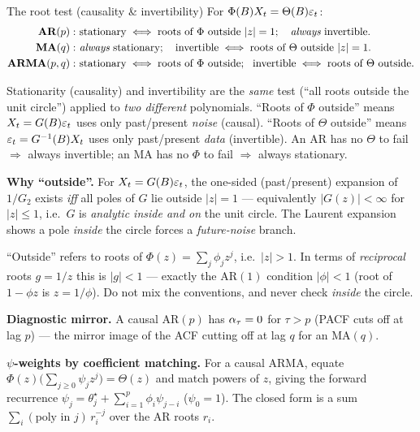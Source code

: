 \documentclass[11pt]{article}
\begin{document}
\begin{result}{The root test (causality \& invertibility)}
For $\Phi(B)X_t=\Theta(B)\varepsilon_t$:
\[
\begin{aligned}
\textbf{AR}(p):&\ \text{stationary}\iff\text{roots of }\Phi\text{ outside }|z|=1;\quad \emph{always}\text{ invertible.}\\
\textbf{MA}(q):&\ \emph{always}\text{ stationary};\quad \text{invertible}\iff\text{roots of }\Theta\text{ outside }|z|=1.\\
\textbf{ARMA}(p,q):&\ \text{stationary}\iff\text{roots of }\Phi\text{ outside};\ \ \text{invertible}\iff\text{roots of }\Theta\text{ outside.}
\end{aligned}
\]
\end{result}

\begin{intu}
Stationarity (causality) and invertibility are the \emph{same} test (``all roots outside the unit circle'') applied to \emph{two different} polynomials. ``Roots of $\Phi$ outside'' means $X_t=G(B)\varepsilon_t$ uses only past/present \emph{noise} (causal). ``Roots of $\Theta$ outside'' means $\varepsilon_t=G^{-1}(B)X_t$ uses only past/present \emph{data} (invertible). An AR has no $\Theta$ to fail $\Rightarrow$ always invertible; an MA has no $\Phi$ to fail $\Rightarrow$ always stationary.
\end{intu}

\textbf{Why ``outside''.} For $X_t=G(B)\varepsilon_t$, the one-sided (past/present) expansion of $1/G_2$ exists \emph{iff} all poles of $G$ lie outside $|z|=1$ --- equivalently $|G(z)|<\infty$ for $|z|\le1$, i.e.\ $G$ is \emph{analytic inside and on} the unit circle. The Laurent expansion shows a pole \emph{inside} the circle forces a \emph{future-noise} branch.
\begin{intu}
``Outside'' refers to roots of $\Phi(z)=\sum_j\phi_j z^j$, i.e.\ $|z|>1$. In terms of \emph{reciprocal} roots $g=1/z$ this is $|g|<1$ --- exactly the $\mathrm{AR}(1)$ condition $|\phi|<1$ (root of $1-\phi z$ is $z=1/\phi$). Do not mix the conventions, and never check \emph{inside} the circle.
\end{intu}

\textbf{Diagnostic mirror.} A causal $\mathrm{AR}(p)$ has $\alpha_\tau=0$ for $\tau>p$ (PACF cuts off at lag $p$) --- the mirror image of the ACF cutting off at lag $q$ for an $\mathrm{MA}(q)$.

\textbf{$\psi$-weights by coefficient matching.} For a causal ARMA, equate $\Phi(z)\big(\sum_{j\ge0}\psi_j z^j\big)=\Theta(z)$ and match powers of $z$, giving the forward recurrence $\psi_j=\theta_j^\star+\sum_{i=1}^p\phi_i\psi_{j-i}$ ($\psi_0=1$). The closed form is a sum $\sum_i(\text{poly in }j)\,r_i^{-j}$ over the AR roots $r_i$.
\end{document}
